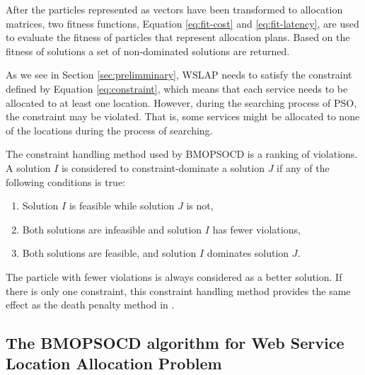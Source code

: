 \documentclass[10pt,journal,compsoc]{IEEEtran}
\begin{document}
After the particles represented as vectors have been transformed to allocation matrices, two fitness functions, Equation \ref{eq:fit-cost} and \ref{eq:fit-latency},  are used to evaluate the fitness of particles that represent allocation plans. Based on the fitness of solutions a set of non-dominated solutions are returned.

As we see in Section \ref{sec:prelimminary}, WSLAP needs to satisfy the constraint defined by Equation \ref{eq:constraint}, which means that each service needs to be allocated to at least one location. However, during the searching process of PSO, the constraint may be violated. That is, some services might be allocated to none of the locations during the process of searching.



The constraint handling method used by BMOPSOCD is a ranking of violations. A solution $I$ is considered to constraint-dominate a solution $J$ if any of the following conditions is true:
\begin{enumerate}
 \item Solution $I$ is feasible while solution $J$ is not,
 \item Both solutions are infeasible and solution $I$ has fewer violations,
 \item Both solutions are feasible, and solution $I$ dominates solution $J$.
\end{enumerate}

The particle with fewer violations is always considered as a better solution. If there is only one constraint, this constraint handling method provides the same effect as the death penalty method in \cite{coello2002theoretical}.

\subsection{The BMOPSOCD algorithm for Web Service Location Allocation Problem}
\end{document}
